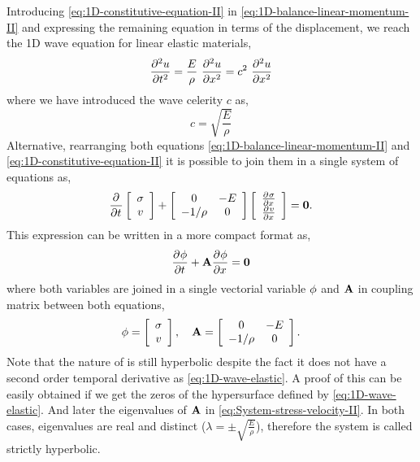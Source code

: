 Introducing \eqref{eq:1D-constitutive-equation-II} in
\eqref{eq:1D-balance-linear-momentum-II} and expressing the remaining
equation in terms of the displacement, we reach the 1D wave
equation for linear elastic materials,
\begin{equation}
  \label{eq:1D-wave-elastic}
  \Deriv[2]{u}{t} = \frac{E}{\rho}\ \Deriv[2]{u}{x} = c^2\ \Deriv[2]{u}{x}
\end{equation}
where we have introduced the wave celerity $c$ as,
\begin{equation}
  \label{eq:1D-elastic-wave-celerity}
  c = \sqrt{\frac{E}{\rho}}
\end{equation}
Alternative, rearranging both equations
\eqref{eq:1D-balance-linear-momentum-II} and
\eqref{eq:1D-constitutive-equation-II} it is possible to join them in a
single system of equations as,
\begin{equation}
  \label{eq:System-stress-velocity}
  \frac{\partial^{}{}}{ \partial {t}^{} } \left[
    \begin{array}{c}
      \sigma \\
      v
    \end{array}
  \right] + \left[
    \begin{array}{cc}
      0 & - E \\
      - 1/\rho & 0 
    \end{array} \right] \left[
    \begin{array}{c}
      \frac{\partial^{}{\sigma}}{ \partial {x}^{} } \\
      \frac{\partial^{}{v}}{ \partial {x}^{} }
    \end{array}
  \right] = \mathbf{{0}}.
\end{equation}
This expression can be written in a more compact format as,
\begin{equation}
  \label{eq:System-stress-velocity-II}
  \frac{\partial^{}{\mathbf{{\phi}}}}{ \partial {t}^{} } + \mathbf{{A}}\frac{\partial^{}{\mathbf{{\phi}}}}{ \partial {x}^{} } = \mathbf{{0}}
\end{equation}
where both variables are joined in a single vectorial variable
$\mathbf{{\phi}}$ and $\mathbf{{A}}$ in coupling matrix between both equations,
\begin{equation*}
  \mathbf{{\phi}} = \left[
    \begin{array}{c}
      \sigma \\
      v
    \end{array}
  \right],\quad 
  \mathbf{{A}} =  \left[
    \begin{array}{cc}
      0 & - E\\
      - 1/\rho & 0 
    \end{array} \right].
\end{equation*}
Note that the nature of \label{eq:eq:System-stress-velocity-II} is still
hyperbolic despite the fact it does not have a second order
temporal derivative as \eqref{eq:1D-wave-elastic}. A proof of this can
be easily obtained if we get the zeros of the hypersurface defined by
\eqref{eq:1D-wave-elastic}. And later the eigenvalues of $\mathbf{{A}}$
in \eqref{eq:System-stress-velocity-II}. In both cases, eigenvalues
are real and distinct ($\lambda = \pm \sqrt{\frac{E}{\rho}}$),
therefore the system is called strictly hyperbolic.

